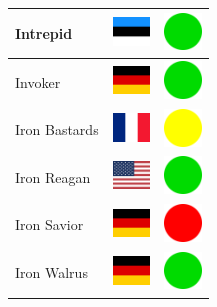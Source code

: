 \documentclass[12pt, a4paper, twoside]{report}
\begin{document}
\begin{center}
\begin{longtable}{|p{5cm}|p{2cm}|p{2cm}|}
 Intrepid                                                   & \includegraphics[width=1cm]{../img/flags/ee} &   \includegraphics[width=1cm]{../likes/y} \\ \hline
 Invoker                                                    & \includegraphics[width=1cm]{../img/flags/de} &   \includegraphics[width=1cm]{../likes/y} \\ \hline
 Iron Bastards                                              & \includegraphics[width=1cm]{../img/flags/fr} &   \includegraphics[width=1cm]{../likes/m} \\ \hline
 Iron Reagan                                                & \includegraphics[width=1cm]{../img/flags/us} &   \includegraphics[width=1cm]{../likes/y} \\ \hline
 Iron Savior                                                & \includegraphics[width=1cm]{../img/flags/de} &   \includegraphics[width=1cm]{../likes/n} \\ \hline
 Iron Walrus                                                & \includegraphics[width=1cm]{../img/flags/de} &   \includegraphics[width=1cm]{../likes/y} \\ \hline

\end{longtable}
\end{center}
\end{document}
